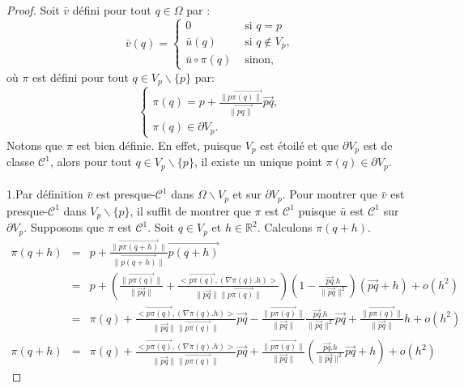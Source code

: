 \begin{proof}
Soit $\bar{v}$ défini pour tout $q\in\Omega$ par :
\begin{equation}
\bar{v}(q)=
\left\{
\begin{array}{ll}
0&\mbox{ si }q=p\\[0.25cm]
\bar{u}(q)&\mbox{ si } q\notin V_p,\\[0.25cm]
\bar{u}\circ\pi(q)&\mbox{ sinon},
\end{array}
\right.
\end{equation}
où $\pi$ est défini pour tout $q\in V_p\backslash\{p\}$ par:
\begin{equation*}
\left\{
\begin{array}{ll}
\pi(q)=p+\displaystyle\frac{\overrightarrow{\|p\pi(q)\|}}{\overrightarrow{\|pq\|}}\overrightarrow{pq},\\[0.5cm]
\pi(q)\in\partial V_p.
\end{array}
\right.
\end{equation*}
Notons que $\pi$ est bien définie. En effet, puisque $V_p$ est étoilé et que $\partial V_p$ est de classe $\mathcal{C}^1$, alors pour tout $q\in V_p\backslash\{p\}$, il existe un unique point $\pi(q)\in\partial V_p$.\\\\
1.\quad Par définition $\bar{v}$ est presque-$\mathcal{C}^1$ dans $\Omega\backslash V_p$ et sur $\partial V_p$. Pour montrer que $\bar{v}$ est presque-$\mathcal{C}^1$ dans $V_p\backslash\{p\}$, il suffit de montrer que $\pi$ est $\mathcal{C}^1$ puisque $\bar{u}$ est $\mathcal{C}^1$ sur $\partial V_p$. Supposons que $\pi$ est $\mathcal{C}^1$. Soit $q\in V_p$ et $h\in\mathbb{R}^2$. Calculons $\pi(q+h)$.
\begin{eqnarray*}
    \pi(q+h)&=&p+\frac{\|\overrightarrow{p\pi(q+h)}\|}{\|\overrightarrow{p(q+h)}\|}\overrightarrow{p(q+h)}\\[0.2cm]
    &=&p+\left(\frac{\|\overrightarrow{p\pi(q)}\|}{\|\overrightarrow{pq}\|}+\frac{<\overrightarrow{p\pi(q)}, (\nabla\pi(q).h)>}{\|\overrightarrow{pq}\|\|\overrightarrow{p\pi(q)}\|}\right)\left(1-\frac{\overrightarrow{pq}.h}{\|\overrightarrow{pq}\|^2}\right)\left(\overrightarrow{pq}+h\right) + o(h^2)\\[0.2cm]
    &=&\pi(q)+\frac{<\overrightarrow{p\pi(q)}, (\nabla\pi(q).h)>}{\|\overrightarrow{pq}\|\|\overrightarrow{p\pi(q)}\|}\overrightarrow{pq}-\frac{\|\overrightarrow{p\pi(q)}\|}{\|\overrightarrow{pq}\|}\frac{\overrightarrow{pq}.h}{\|\overrightarrow{pq}\|^2}\overrightarrow{pq}+\frac{\|\overrightarrow{p\pi(q)}\|}{\|\overrightarrow{pq}\|}h+o(h^2)\\[0.2cm]
    \pi(q+h)&=&\pi(q)+\frac{<\overrightarrow{p\pi(q)}, (\nabla\pi(q).h)>}{\|\overrightarrow{pq}\|\|\overrightarrow{p\pi(q)}\|}\overrightarrow{pq}+\frac{\|\overrightarrow{p\pi(q)}\|}{\|\overrightarrow{pq}\|}\left(\frac{\overrightarrow{pq}.h}{\|\overrightarrow{pq}\|^2}\overrightarrow{pq}+h\right)+o(h^2)
\end{eqnarray*}


\end{proof}
